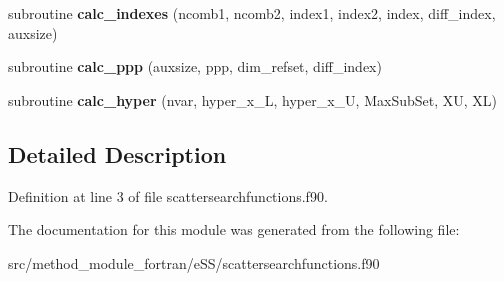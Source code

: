 \begin{DoxyCompactItemize}
\item 
\hypertarget{classscattersearchfunctions_aff4d139fb41ee819ab67b03d2aa1844f}{subroutine {\bfseries calc\-\_\-indexes} (ncomb1, ncomb2, index1, index2, index, diff\-\_\-index, auxsize)}\label{classscattersearchfunctions_aff4d139fb41ee819ab67b03d2aa1844f}

\item 
\hypertarget{classscattersearchfunctions_a95fc2d0f49529d0b5c0b6a2a769ed793}{subroutine {\bfseries calc\-\_\-ppp} (auxsize, ppp, dim\-\_\-refset, diff\-\_\-index)}\label{classscattersearchfunctions_a95fc2d0f49529d0b5c0b6a2a769ed793}

\item 
\hypertarget{classscattersearchfunctions_a418e3a0c92d02ba52822cd17818aa8ce}{subroutine {\bfseries calc\-\_\-hyper} (nvar, hyper\-\_\-x\-\_\-\-L, hyper\-\_\-x\-\_\-\-U, Max\-Sub\-Set, X\-U, X\-L)}\label{classscattersearchfunctions_a418e3a0c92d02ba52822cd17818aa8ce}

\end{DoxyCompactItemize}


\subsection{Detailed Description}


Definition at line 3 of file scattersearchfunctions.\-f90.



The documentation for this module was generated from the following file\-:\begin{DoxyCompactItemize}
\item 
src/method\-\_\-module\-\_\-fortran/e\-S\-S/scattersearchfunctions.\-f90\end{DoxyCompactItemize}
